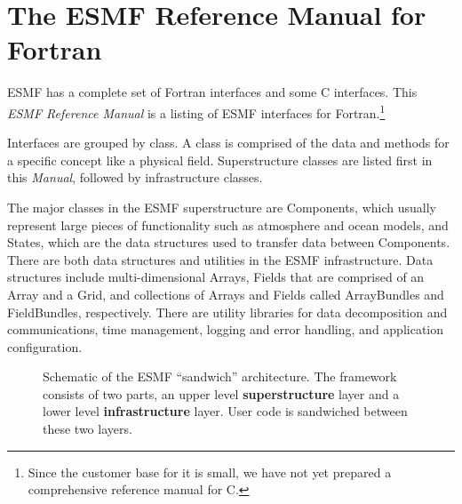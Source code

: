 

\section{The ESMF Reference Manual for Fortran}

ESMF has a complete set of Fortran interfaces and
some C interfaces.  This {\it ESMF Reference Manual} is a listing of 
ESMF interfaces for Fortran.\footnote{Since the customer base for it is 
small, we have not yet prepared a comprehensive reference manual for C.}  

Interfaces are grouped by class.  A class is comprised of the data and
methods for a specific concept like a physical field.  Superstructure classes 
are listed first in this {\it Manual}, followed by infrastructure 
classes.

The major classes in the ESMF superstructure are Components, which 
usually represent
large pieces of functionality such as atmosphere and ocean models,
and States, which are the data structures
used to transfer data between Components.  There are both data
structures and utilities in the ESMF 
infrastructure. Data structures include multi-dimensional Arrays, Fields
that are comprised of an Array and a Grid, and collections of Arrays
and Fields called ArrayBundles and FieldBundles, respectively.
There are utility libraries for data decomposition and communications,
time management, logging and error handling, and application configuration.

\begin{center}
\begin{figure}
\caption{Schematic of the ESMF ``sandwich'' architecture.
The framework consists of two parts, an upper level
{\bf superstructure} layer and a lower level {\bf infrastructure} layer.
User code is sandwiched between these two layers.}
\label{fig:TheESMFwich}
\end{figure}
\end{center}

